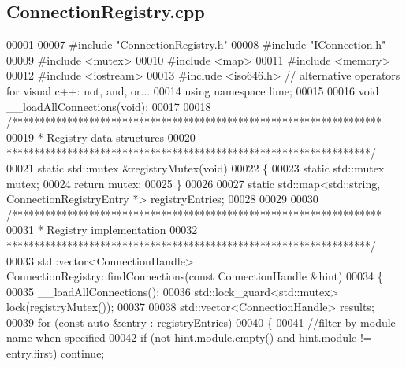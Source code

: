 \subsection{Connection\+Registry.\+cpp}
\label{ConnectionRegistry_8cpp_source}

\begin{DoxyCode}
00001 
00007 \textcolor{preprocessor}{#include "ConnectionRegistry.h"}
00008 \textcolor{preprocessor}{#include "IConnection.h"}
00009 \textcolor{preprocessor}{#include <mutex>}
00010 \textcolor{preprocessor}{#include <map>}
00011 \textcolor{preprocessor}{#include <memory>}
00012 \textcolor{preprocessor}{#include <iostream>}
00013 \textcolor{preprocessor}{#include <iso646.h>} \textcolor{comment}{// alternative operators for visual c++: not, and, or...}
00014 \textcolor{keyword}{using namespace }lime;
00015 
00016 \textcolor{keywordtype}{void} __loadAllConnections(\textcolor{keywordtype}{void});
00017 
00018 \textcolor{comment}{/*******************************************************************}
00019 \textcolor{comment}{ * Registry data structures}
00020 \textcolor{comment}{ ******************************************************************/}
00021 \textcolor{keyword}{static} std::mutex &registryMutex(\textcolor{keywordtype}{void})
00022 \{
00023     \textcolor{keyword}{static} std::mutex mutex;
00024     \textcolor{keywordflow}{return} mutex;
00025 \}
00026 
00027 \textcolor{keyword}{static} std::map<std::string, ConnectionRegistryEntry *> registryEntries;
00028 
00029 
00030 \textcolor{comment}{/*******************************************************************}
00031 \textcolor{comment}{ * Registry implementation}
00032 \textcolor{comment}{ ******************************************************************/}
00033 std::vector<ConnectionHandle> ConnectionRegistry::findConnections(\textcolor{keyword}{const} 
      ConnectionHandle &hint)
00034 \{
00035     __loadAllConnections();
00036     std::lock\_guard<std::mutex> lock(registryMutex());
00037 
00038     std::vector<ConnectionHandle> results;
00039     \textcolor{keywordflow}{for} (\textcolor{keyword}{const} \textcolor{keyword}{auto} &entry : registryEntries)
00040     \{
00041         \textcolor{comment}{//filter by module name when specified}
00042         \textcolor{keywordflow}{if} (not hint.module.empty() and hint.module != entry.first) \textcolor{keywordflow}{continue};

\end{DoxyCode}
